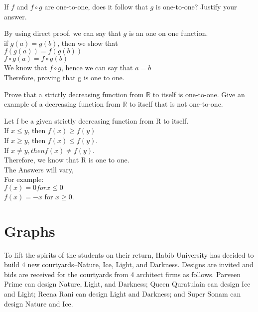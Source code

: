 \documentclass[addpoints]{exam}
\begin{document}
\begin{questions}
\question[5] If $f$ and $f \circ g$ are one-to-one, does it follow that $g$ is one-to-one? Justify your answer.
  \begin{solution}
    
    By using direct proof, we can say that $g$ is an one on one function.\\
    if $g(a)=g(b)$, then we show that\\
    $f(g(a))=f(g(b))$\\
    $f\circ g (a) = f\circ g (b)$\\
    We know that $f\circ g$, hence we can say that $a=b$\\
    Therefore, proving that g is one to one.




  \end{solution}

\question[5] Prove that a strictly decreasing function from $\mathbb{R}$ to itself is one-to-one. Give an example of a decreasing function from $\mathbb{R}$ to itself that is not one-to-one.
  \begin{solution}
    Let f be a given strictly decreasing function from R to itself. \\
    If $x \le y$, then $f(x) \ge f(y)$ \\
    If $x \ge y$, then $f(x) \le f(y)$. \\
    If $x \neq  y, then f (x) \neq  f (y)$.\\
    Therefore, we know that R is one to one.\\
The Answers will vary,\\
For example: \\
$f (x) = 0 for x \le 0$\\
$f (x) = -x$ for $x \geq  0.$
  \end{solution}
  
  \section*{Graphs}
  
\question To lift the spirits of the students on their return, Habib University has decided to build 4 new courtyards--Nature, Ice, Light, and Darkness. Designs are invited and bids are received for the courtyards from 4 architect firms as follows. Parveen Prime can design Nature, Light, and Darkness; Queen Quratulain can design Ice and Light; Reena Rani can design Light and Darkness; and Super Sonam can design Nature and Ice.
  \begin{parts}

\end{parts}
\end{questions}
\end{document}

